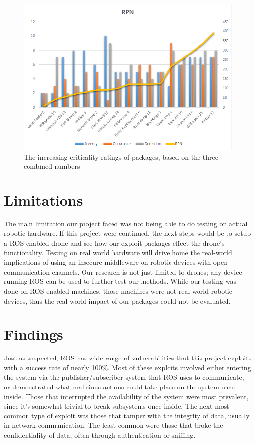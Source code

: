 \documentclass[IEEEtran,letterpaper,10pt,notitlepage,draftclsnofoot]{article}
\begin{document}
\begin{figure}[H]
    \centering
    \includegraphics[width=\textwidth]{RPN}
    \caption{The increasing criticality ratings of packages, based on the three combined numbers}
\end{figure}

\section{Limitations}
The main limitation our project faced was not being able to do testing on actual robotic hardware.
If this project were continued, the next steps would be to setup a ROS enabled drone and see how our exploit packages effect the drone's functionality.
Testing on real world hardware will drive home the real-world implications of using an insecure middleware on robotic devices with open communication channels.
Our research is not just limited to drones; any device running ROS can be used to further test our methods.
While our testing was done on ROS enabled machines, those machines were not real-world robotic devices, thus the real-world impact of our packages could not be evaluated.

\section{Findings}
Just as suspected, ROS has wide range of vulnerabilities that this project exploits with a success rate of nearly 100\%.
Most of these exploits involved either entering the system via the publisher/subscriber system that ROS uses to communicate, or demonstrated what malicious actions could take place on the system once inside.
Those that interrupted the availability of the system were most prevalent, since it's somewhat trivial to break subsystems once inside.
The next most common type of exploit was those that tamper with the integrity of data, usually in network communication.
The least common were those that broke the confidentiality of data, often through authentication or sniffing.
\end{document}
